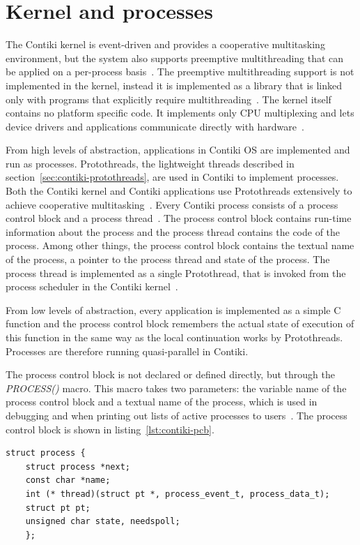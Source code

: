 
\section{Kernel and processes}\label{sec:contiki-kernel}
The Contiki kernel is event-driven and provides a cooperative multitasking
environment, but the system also supports preemptive
multithreading that can be applied on a per-process basis~\cite{paper-contiki}.
The preemptive multithreading support is not implemented in the kernel, instead
it is implemented as a library that is linked only with programs that
explicitly require multithreading~\cite{paper-contiki}.
The kernel itself contains no platform specific code.
It implements only CPU multiplexing and
lets device drivers and applications communicate directly with hardware~\cite{paper-contiki}. %

From high levels of abstraction,
applications in Contiki OS are implemented and run as processes.
Protothreads, the lightweight threads described in section~\ref{sec:contiki-protothreads},
are used in Contiki to implement processes.
Both the Contiki kernel and Contiki applications use
Protothreads extensively to achieve cooperative multitasking~\cite{contiki-wiki-faq}.
Every Contiki process consists of a process control block and a process thread~\cite{contiki-wiki-processes}.
The process control block contains run-time information about the process and
the process thread contains the code of the process.
Among other things, the process control block contains
the textual name of the process, a pointer to the process thread and state of the process.
The process thread is implemented as a single Protothread,
that is invoked from the process scheduler in the Contiki kernel~\cite{contiki-wiki-processes}.

From low levels of abstraction,
every application is implemented as a simple C function
and the process control block remembers the actual state of execution of this function
in the same way as the local continuation works by Protothreads.
Processes are therefore running quasi-parallel in Contiki.

The process control block is not declared or defined directly,
but through the {\it{PROCESS()}} macro.
This macro takes two parameters: the variable name of the process control block
and a textual name of the process,
which is used in debugging and when printing out lists of active processes to users~\cite{contiki-wiki-processes}.
The process control block is shown in listing~\ref{lst:contiki-pcb}.
\bigskip
\begin{lstlisting}[caption={Process control block in Contiki OS (source~\cite{contiki-wiki-processes})},label={lst:contiki-pcb}]
struct process {
	struct process *next;
	const char *name;
	int (* thread)(struct pt *, process_event_t, process_data_t);
	struct pt pt;
	unsigned char state, needspoll;
	};
\end{lstlisting}

